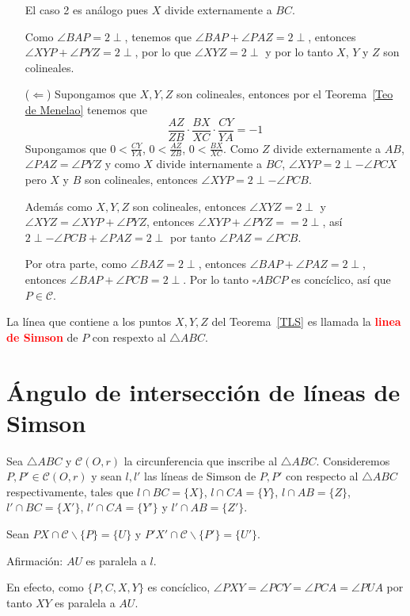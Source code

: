 \begin{dem}
\begin{enumerate}
El caso 2 es análogo pues $X$ divide externamente a $BC$.

Como $\angle BAP=2\perp$, tenemos que $\angle BAP+\angle PAZ=2\perp$, entonces $\angle XYP+\angle PYZ=2\perp$, por lo que $\angle XYZ=2\perp$ y por lo tanto $X$, $Y$ y $Z$ son colineales. 

\item [($\Leftarrow$)]
Supongamos que $X,Y,Z$ son colineales, entonces por el Teorema~\ref{Teo de Menelao} tenemos que 
$$\frac{AZ}{ZB}\cdot\frac{BX}{XC}\cdot\frac{CY}{YA}=-1$$
Supongamos que $0<\frac{CY}{YA}$, $0<\frac{AZ}{ZB}$, $0<\frac{BX}{XC}$. Como $Z$ divide externamente a $AB$, $\angle PAZ=\angle PYZ$ y como $X$ divide internamente a $BC$, $\angle XYP=2\perp -\angle PCX$ pero $X$ y $B$ son colineales, entonces $\angle XYP=2\perp - \angle PCB$. 

Además como $X,Y,Z$ son colineales, entonces $\angle XYZ=2\perp$ y $\angle XYZ=\angle XYP+\angle PYZ$, entonces $\angle XYP+\angle PYZ==2\perp$, así $2\perp -\angle PCB+\angle PAZ=2\perp$ por tanto $\angle PAZ=\angle PCB$. 

Por otra parte, como $\angle BAZ=2\perp$, entonces $\angle BAP+\angle PAZ=2\perp$, entonces $\angle BAP+\angle PCB=2\perp$.
Por lo tanto $\square ABCP$ es concíclico, así que $P\in\mathcal{C}$.
\end{enumerate}
\end{dem}

La línea que contiene a los puntos $X,Y,Z$ del Teorema~\ref{TLS} es llamada la \textcolor{red}{\bf linea de Simson} de $P$ con respexto al $\triangle ABC$.
\section{Ángulo de intersección de líneas de Simson}

Sea $\triangle ABC$ y $\mathcal{C}(O,r)$ la circunferencia que inscribe al $\triangle ABC$. Consideremos $P,P'\in\mathcal{C}(O,r)$ y sean $l,l'$ las líneas de Simson de $P,P'$ con respecto al $\triangle ABC$ respectivamente, tales que $l\cap BC=\{X\}$, $l\cap CA=\{Y\}$, $l\cap AB=\{Z\}$, $l'\cap BC=\{X'\}$, $l'\cap CA=\{Y'\}$ y $l'\cap AB=\{Z'\}$. 

Sean $PX\cap\mathcal{C}\backslash\{P\}=\{U\}$ y $P'X'\cap\mathcal{C}\backslash\{P'\}=\{U'\}$.

Afirmación: $AU$ es paralela a $l$.

En efecto, como $\{P,C,X,Y\}$ es concíclico, $\angle PXY= \angle PCY=\angle PCA=\angle PUA$ por tanto $XY$ es paralela a $AU$.

